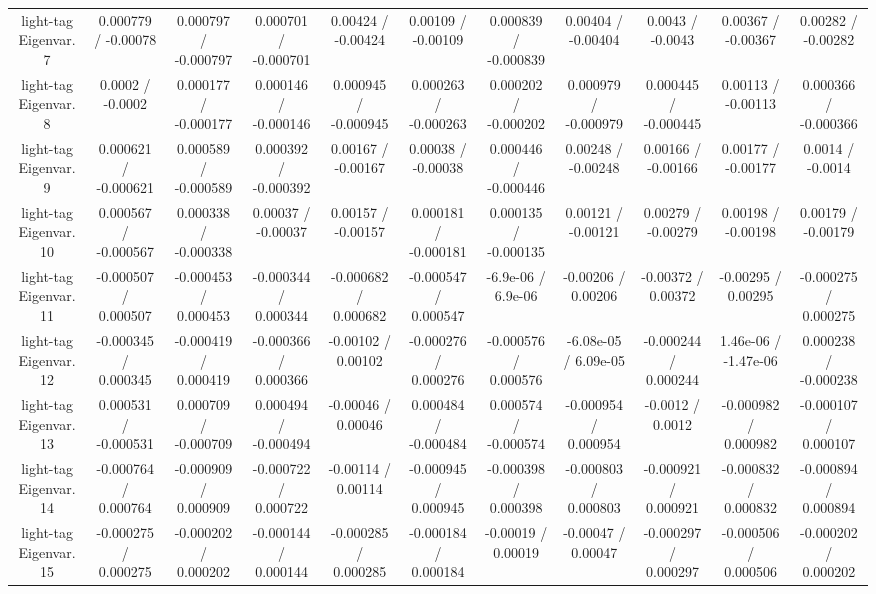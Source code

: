 \begin{table}[htbp]
\begin{center}
\begin{tabular}{|c|c|c|c|c|c|c|c|c|c|c|}
  light-tag Eigenvar. 7 & 0.000779 / -0.00078 & 0.000797 / -0.000797 & 0.000701 / -0.000701 & 0.00424 / -0.00424 & 0.00109 / -0.00109 & 0.000839 / -0.000839 & 0.00404 / -0.00404 & 0.0043 / -0.0043 & 0.00367 / -0.00367 & 0.00282 / -0.00282 \\ 
  light-tag Eigenvar. 8 & 0.0002 / -0.0002 & 0.000177 / -0.000177 & 0.000146 / -0.000146 & 0.000945 / -0.000945 & 0.000263 / -0.000263 & 0.000202 / -0.000202 & 0.000979 / -0.000979 & 0.000445 / -0.000445 & 0.00113 / -0.00113 & 0.000366 / -0.000366 \\ 
  light-tag Eigenvar. 9 & 0.000621 / -0.000621 & 0.000589 / -0.000589 & 0.000392 / -0.000392 & 0.00167 / -0.00167 & 0.00038 / -0.00038 & 0.000446 / -0.000446 & 0.00248 / -0.00248 & 0.00166 / -0.00166 & 0.00177 / -0.00177 & 0.0014 / -0.0014 \\ 
  light-tag Eigenvar. 10 & 0.000567 / -0.000567 & 0.000338 / -0.000338 & 0.00037 / -0.00037 & 0.00157 / -0.00157 & 0.000181 / -0.000181 & 0.000135 / -0.000135 & 0.00121 / -0.00121 & 0.00279 / -0.00279 & 0.00198 / -0.00198 & 0.00179 / -0.00179 \\ 
  light-tag Eigenvar. 11 & -0.000507 / 0.000507 & -0.000453 / 0.000453 & -0.000344 / 0.000344 & -0.000682 / 0.000682 & -0.000547 / 0.000547 & -6.9e-06 / 6.9e-06 & -0.00206 / 0.00206 & -0.00372 / 0.00372 & -0.00295 / 0.00295 & -0.000275 / 0.000275 \\ 
  light-tag Eigenvar. 12 & -0.000345 / 0.000345 & -0.000419 / 0.000419 & -0.000366 / 0.000366 & -0.00102 / 0.00102 & -0.000276 / 0.000276 & -0.000576 / 0.000576 & -6.08e-05 / 6.09e-05 & -0.000244 / 0.000244 & 1.46e-06 / -1.47e-06 & 0.000238 / -0.000238 \\ 
  light-tag Eigenvar. 13 & 0.000531 / -0.000531 & 0.000709 / -0.000709 & 0.000494 / -0.000494 & -0.00046 / 0.00046 & 0.000484 / -0.000484 & 0.000574 / -0.000574 & -0.000954 / 0.000954 & -0.0012 / 0.0012 & -0.000982 / 0.000982 & -0.000107 / 0.000107 \\ 
  light-tag Eigenvar. 14 & -0.000764 / 0.000764 & -0.000909 / 0.000909 & -0.000722 / 0.000722 & -0.00114 / 0.00114 & -0.000945 / 0.000945 & -0.000398 / 0.000398 & -0.000803 / 0.000803 & -0.000921 / 0.000921 & -0.000832 / 0.000832 & -0.000894 / 0.000894 \\ 
  light-tag Eigenvar. 15 & -0.000275 / 0.000275 & -0.000202 / 0.000202 & -0.000144 / 0.000144 & -0.000285 / 0.000285 & -0.000184 / 0.000184 & -0.00019 / 0.00019 & -0.00047 / 0.00047 & -0.000297 / 0.000297 & -0.000506 / 0.000506 & -0.000202 / 0.000202 \\ 

\end{tabular}
\end{center}
\end{table}
